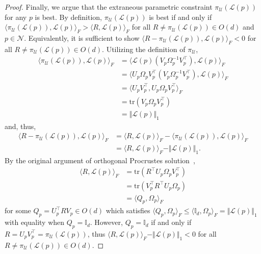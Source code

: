 \documentclass[pdflatex,iicol]{sn-jnl}%
\theoremstyle{thmstyleone}%
\theoremstyle{thmstyletwo}%
\theoremstyle{thmstylethree}%
\begin{document}
\begin{proof}
    Finally, we argue that the extraneous parametric constraint $\pi_{\mathcal{U}}(\mathcal{L}(p))$ for any $p$ is best. By definition, $\pi_{\mathcal{U}}(\mathcal{L}(p))$ is best if and only if $\langle \pi_{\mathcal{U}}(\mathcal{L}(p)),\mathcal{L}(p)\rangle_F > \langle R ,\mathcal{L}(p)\rangle_F$ for all $R \neq \pi_{\mathcal{U}}(\mathcal{L}(p)) \in O(d)$ and $p \in \mathcal{N}$. Equivalently, it is sufficient to show $\langle R - \pi_{\mathcal{U}}(\mathcal{L}(p)), \mathcal{L}(p) \rangle_F<0$ for all $R \neq \pi_{\mathcal{U}}(\mathcal{L}(p)) \in O(d)$. Utilizing the definition of $\pi_{\mathcal{U}}$,
    \begin{align*}
        \langle \pi_{\mathcal{U}}(\mathcal{L}(p)), \mathcal{L}(p)\rangle_F &= \langle \mathcal{L}(p)(V_p\Omega_p^{-1}V_p^{\top}), \mathcal{L}(p) \rangle_F\\
        & = \langle U_p\Omega_pV_p^{\top}(V_p\Omega_p^{-1}V_p^{\top}), \mathcal{L}(p) \rangle_F\\
        & = \langle U_pV_p^{\top}, U_p\Omega_pV_p^{\top} \rangle_F\\
        & = \text{tr}(V_p\Omega_pV_p^{\top})\\
        &= \Vert \mathcal{L}(p) \Vert_1
    \end{align*}
    and, thus,
    \begin{align*}
        \langle R - \pi_{\mathcal{U}}(\mathcal{L}(p)),\mathcal{L}(p)\rangle_F &= \langle R,\mathcal{L}(p)\rangle_F - \langle \pi_{\mathcal{U}}(\mathcal{L}(p)), \mathcal{L}(p)\rangle_F \\
        &= \langle R,\mathcal{L}(p)\rangle_F - \Vert \mathcal{L}(p) \Vert_1.
    \end{align*}
    By the original argument of orthogonal Procrustes solution~\cite{gibson1962least, schonemann1966generalized, lawrence2019purely}, 
    \begin{align*}
        \langle R,\mathcal{L}(p)\rangle_F &= \text{tr}(R^{\top}U_p\Omega_pV_p^{\top}) \\
        &= \text{tr}(V_p^{\top}R^{\top}U_p\Omega_p) \\
        &= \langle Q_p, \Omega_p\rangle_F
    \end{align*}
    for some $Q_p =  U_p^{\top}RV_p \in O(d)$ which satisfies $\langle Q_p, \Omega_p\rangle_F \leq \langle \mathbb{I}_d, \Omega_p\rangle_F = \Vert \mathcal{L}(p) \Vert_1$ with equality when $Q_p = \mathbb{I}_d$. However, $Q_p = \mathbb{I}_d$ if and only if $R = U_pV_p^{\top} = \pi_{\mathcal{U}}(\mathcal{L}(p))$, thus $\langle R,\mathcal{L}(p)\rangle_F - \Vert \mathcal{L}(p) \Vert_1 < 0$ for all $R \neq \pi_{\mathcal{U}}(\mathcal{L}(p)) \in O(d)$.
\end{proof}
\end{document}
